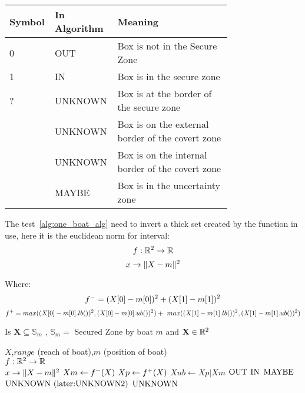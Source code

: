 \begin{center}
\begin{tabular}{|m{0.10\linewidth}|m{0.15\linewidth}|m{0.5\linewidth}|}
\hline
 Symbol & In Algorithm  & Meaning  \\ \hline
 0 & OUT & Box is not in the Secure Zone  \\ \hline
 1 & IN & Box is in the secure zone \\ \hline
 ? & UNKNOWN & Box is at the border of the secure zone  \\ \hline
[0,?]& UNKNOWN  & Box is on the external border of the covert zone \\ \hline
[?,1]& UNKNOWN  & Box is on the internal border of the covert zone\\ \hline
[0,1]& MAYBE  & Box is in the uncertainty zone\\ \hline
   
\end{tabular}
\end{center}

The test~\ref{alg:one_boat_alg} need to invert a thick set created by the function in use, here it is the euclidean norm for interval:
 \[ f : \mathbb{R^{\textnormal{\ensuremath{2}}}} \rightarrow \mathbb{R} \]
   \[x \rightarrow \|X-m\|^{\textnormal{\ensuremath{2}}}\]
   
 Where: 
 \[f^{\textnormal{\ensuremath{-}}} = (X[0]-m[0])^{\textnormal{\ensuremath{2}}}+(X[1]-m[1])^{\textnormal{\ensuremath{2}}}\] 
\[f^{\textnormal{\ensuremath{+}}} = max((X[0]-m[0].lb())^{\textnormal{\ensuremath{2}}},(X[0]-m[0].ub())^{\textnormal{\ensuremath{2}}}) + \
                  max((X[1]-m[1].lb())^{\textnormal{\ensuremath{2}}},(X[1]-m[1].ub())^{\textnormal{\ensuremath{2}}})\] 

\begin{algorithm}[H]
\caption{Is $\mathbf{X} \subseteq \mathbb{S}_m$ , $\mathbb{S}_m =$ Secured Zone by boat $m$ and $\mathbf{X} \in \mathbb{R^{\textnormal{\ensuremath{2}}}}$ }
\label{alg:one_boat_alg}
\begin{algorithmic}[1]
\REQUIRE $X$,$range $ (reach of boat),$m$ (position of boat)\\
  $ f : \mathbb{R^{\textnormal{\ensuremath{2}}}} \rightarrow \mathbb{R} $\\
   $x \rightarrow \|X-m\|^{\textnormal{\ensuremath{2}}}$
\STATE $Xm \leftarrow f^{\textnormal{\ensuremath{-}}}(X) $
\STATE $Xp \leftarrow f^{\textnormal{\ensuremath{+}}}(X) $
\STATE $Xub \leftarrow Xp | Xm$
\RETURN $\textnormal{OUT}$
\RETURN $\textnormal{IN}$
\ELSE
\IF{ $\textnormal{range}^{\textnormal{\ensuremath{2}}} - Xp.ub() < \textnormal{0}] $}
\RETURN $\textnormal{MAYBE}$ \label{op1}
\ELSE
\RETURN $\textnormal{UNKNOWN (later:UNKNOWN2)}$ \label{op0}
\ENDIF
\ELSE
\RETURN $\textnormal{UNKNOWN}$
\ENDIF
\ENDIF
\end{algorithmic}
\end{algorithm}


